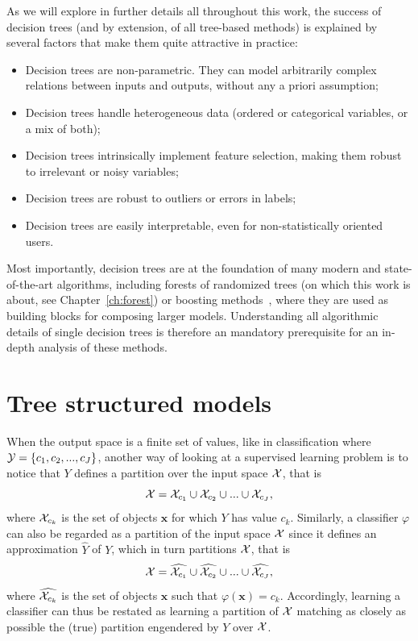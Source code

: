 As we will explore in further details all throughout this work, the success
of decision trees (and by extension, of all tree-based methods) is explained
by several factors that make them quite attractive in practice:
\begin{itemize}
\item Decision trees are non-parametric. They can model arbitrarily complex relations between inputs and outputs, without any a priori assumption;
\item Decision trees handle heterogeneous data (ordered or categorical variables, or a mix of both);
\item Decision trees intrinsically implement feature selection, making them robust to irrelevant or noisy variables;
\item Decision trees are robust to outliers or errors in labels;
\item Decision trees are easily interpretable, even for non-statistically oriented users.
\end{itemize}

Most importantly, decision trees are at the foundation of many modern and
state-of-the-art algorithms, including forests of randomized trees (on which
this work is about, see Chapter~\ref{ch:forest}) or boosting
methods~\citep{freund:1995,friedman:2001}, where they are used as building
blocks for composing larger models. Understanding all algorithmic details of
single decision trees is therefore an mandatory prerequisite for an in-depth
analysis of these methods.


\section{Tree structured models}
\label{sec:3:tree-structured-models}

When the output space is a finite set of values, like in classification where
${\cal Y} = \{c_1, c_2, ..., c_J\}$, another way of looking at a supervised
learning problem is to notice that $Y$ defines a partition over the input space ${\cal X}$, that
is
\begin{equation}
{\cal X} = {\cal X}_{c_1} \cup {\cal X}_{c_2} \cup ... \cup {\cal X}_{c_J},
\end{equation}
where ${\cal X}_{c_k}$ is the set of objects $\mathbf{x}$ for which
$Y$ has value $c_k$. Similarly, a classifier $\varphi$ can also be
regarded as a partition of the input space
${\cal X}$ since it defines an approximation $\widehat{Y}$ of $Y$, which in
turn partitions ${\cal X}$, that is
\begin{equation}\label{eqn:3:partition}
{\cal X} = \widehat{{\cal X}_{c_1}} \cup \widehat{{\cal X}_{c_2}} \cup ... \cup \widehat{{\cal X}_{c_J}},
\end{equation}
where
$\widehat{{\cal X}_{c_k}}$ is the set of objects $\mathbf{x}$ such that
$\varphi(\mathbf{x}) = c_k$. Accordingly, learning a classifier can thus
be restated as learning a partition of ${\cal X}$ matching as closely as
possible the (true) partition engendered by $Y$ over ${\cal X}$.

